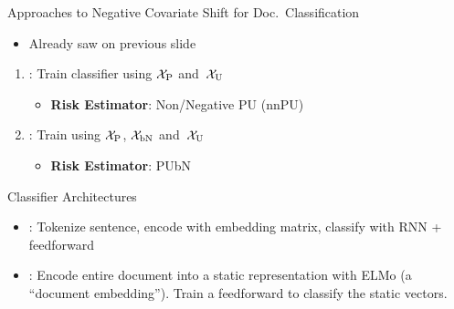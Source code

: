 \begin{frame}{Approaches to Negative Covariate Shift for Doc.\ Classification}
  \begin{itemize}[<+->]
    \item Already saw on previous slide
  \end{itemize}
  \vfill
  \begin{enumerate}[<+->][a]
    \setlength{\itemsep}{12pt}
    \item \textbf{}: Train classifier using $\mathcal{X}_{\textnormal{P}}$ and~$\mathcal{X}_{\textnormal{U}}$~\cite{Fei:2015}
      \begin{itemize}
        \item \textbf{Risk Estimator}: Non\-/Negative PU (nnPU)~\cite{Kiryo:2017}
      \end{itemize}
    \item \textbf{}: Train using $\mathcal{X}_{\textnormal{P}}$, $\mathcal{X}_{\textnormal{bN}}$ and~$\mathcal{X}_{\textnormal{U}}$
      \begin{itemize}
        \item \textbf{Risk Estimator}: PUbN~\cite{Hsieh:2018}
      \end{itemize}
  \end{enumerate}
\end{frame}

\begin{frame}{Classifier Architectures}
  \vfill
  \begin{itemize}[<+->]
    \setlength{\itemsep}{24pt}
    \item {}: Tokenize sentence, encode with embedding matrix, classify with RNN + feedforward

    \item {}: Encode entire document into a static representation with ELMo (a ``document embedding'').  Train a feedforward to classify the static vectors.
  \end{itemize}
  \vfill
\end{frame}

